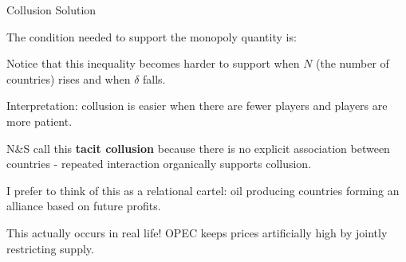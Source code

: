 \documentclass[aspectratio=169]{beamer}
\newenvironment{wideitemize}{\itemize\addtolength{\itemsep}{10pt}}{\enditemize}
\begin{document}
\begin{frame}{Collusion Solution  }

\begin{wideitemize}
    \item The condition needed to support the monopoly quantity is:
    
    \item Notice that this inequality becomes harder to support when $N$ (the number of countries) rises and when $\delta $ falls.
    \item Interpretation: collusion is easier when there are fewer players and players are more patient.
    \item N\&S call this \textbf{tacit collusion} because there is no explicit association between countries - repeated interaction organically supports collusion.
    \item I prefer to think of this as a relational cartel: oil producing countries forming an alliance based on future profits.
    \item This actually occurs in real life! OPEC keeps prices artificially high by jointly restricting supply.
\end{wideitemize}
    
\end{frame}
\end{document}
